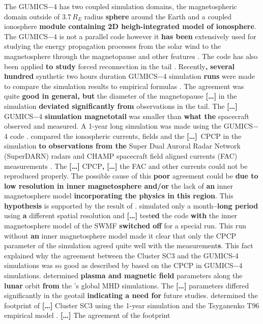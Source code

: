 \documentclass[linenumbers,draft]{agujournal}
\begin{document}
The GUMICS$-$4 has two coupled simulation domains, the magnetospheric domain outside of 3.7\,$R_E$ radius \textbf{sphere} around the Earth and a coupled ionosphere \textbf{module containing 2D heigh-integrated model of ionosphere}. The GUMICS$-$4 is not a parallel code however it \textbf{has been} extensively used for studying the energy propagation processes from the solar wind to the magnetosphere through the magnetopause and other features \citep[][see the references therein]{janhunen12:_gumic_mhd}. The code has also been applied \textbf{to study} forced reconnection in the tail \citep{voeroes14:_winds_condit_ram_co_ram}. Recently\textbf{,} \textbf{several hundred} synthetic two hours duration GUMICS$-$4 simulation \textbf{runs} were made to compare the simulation results to empirical formulas \citep{gordeev13:_verif_gumic_mhd}. The agreement was quite \textbf{good in general, but} the diameter of the magnetopause \textbf{[\dots]} in the simulation \textbf{deviated significantly from} observations in the tail. The \textbf{[\dots]} GUMICS$-$4 \textbf{simulation magnetotail} was smaller than \textbf{what the} spacecraft observed and measured. A 1-year long simulation was made using the GUMICS$-$4 code \citep{facsko16:_one_earth}. \citet{juusola14:_statis_gumic_mhd} compared the ionospheric currents, fields and the \textbf{[\dots]}\  CPCP in the simulation \textbf{to observations from the} Super Dual Auroral Radar Network (SuperDARN) radars \citep{greenwald95:_darn_super} and CHAMP spacecraft \citep{reigber02:_champ} field aligned currents (FAC) measurements \citep{juusola07:_hall_peder_champ,ritter04:_ionos_champ_image}. The \textbf{[\dots]} CPCP\textbf{,} \textbf{[\dots]} the FAC and other currents could not be reproduced properly. The possible cause of this \textbf{poor} agreement could be \textbf{due to low resolution in inner magnetosphere and/or} the lack of \textbf{an} inner magnetosphere model \textbf{incorporating the physics in this region}. This \textbf{hypothesis} is supported by the result of \citet{haiducek17:_swmf_global_magnet_simul_januar}. \citeauthor{haiducek17:_swmf_global_magnet_simul_januar} simulated only a month\textbf{--long period} using \textbf{a} different spatial resolution and \textbf{[\dots]} test\textbf{ed} the code \textbf{with} the inner magnetosphere model of the SWMF \textbf{switched off} for a special run. This run without \textbf{an} inner magnetosphere model made it clear that only the CPCP parameter of the simulation agreed quite well with the measurement\textbf{s}. This fact explained why the agreement between the Cluster SC3 and the GUMICS-4 simulations was so good as described by \textbf{\citet{lakka18:_cross_polar_cap_satur_gumic,lakka18:_icme_earth_mach}} based on the CPCP in GUMICS$-$4 simulations. \citet{kallio15:_proper} determined \textbf{plasma and magnetic field} parameters along the \textbf{lunar} orbit \textbf{from} the \citet{facsko16:_one_earth}'s global MHD simulations. The \textbf{[\dots]} parameters differed significantly in the geotail \textbf{indicating a need for} future studies. \citet{facsko16:_one_earth} determined the footprint of \textbf{[\dots]} Cluster SC3 using the 1-year simulation and the Tsyganenko T96 empirical model \citep{tsyganenko95:_model_earth}. \textbf{[\dots]} The agreement of the footprint 
\end{document}

